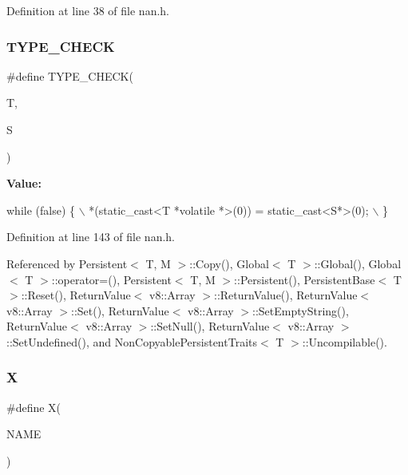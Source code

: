 Definition at line 38 of file nan.\+h.

\mbox{\label{nan_8h_af595745a6f551e1fb35ee4a70a701875}} 
\subsubsection{T\+Y\+P\+E\+\_\+\+C\+H\+E\+CK}
{\footnotesize\ttfamily \#define T\+Y\+P\+E\+\_\+\+C\+H\+E\+CK(\begin{DoxyParamCaption}\item[{}]{T,  }\item[{}]{S }\end{DoxyParamCaption})}

{\bfseries Value\+:}
\begin{DoxyCode}
\textcolor{keywordflow}{while} (\textcolor{keyword}{false}) \{                                                            \(\backslash\)
      *(\textcolor{keyword}{static\_cast<}T *\textcolor{keyword}{volatile }*\textcolor{keyword}{>}(0)) = \textcolor{keyword}{static\_cast<}S*\textcolor{keyword}{>}(0);                   \(\backslash\)
    \}
\end{DoxyCode}


Definition at line 143 of file nan.\+h.



Referenced by Persistent$<$ T, M $>$\+::\+Copy(), Global$<$ T $>$\+::\+Global(), Global$<$ T $>$\+::operator=(), Persistent$<$ T, M $>$\+::\+Persistent(), Persistent\+Base$<$ T $>$\+::\+Reset(), Return\+Value$<$ v8\+::\+Array $>$\+::\+Return\+Value(), Return\+Value$<$ v8\+::\+Array $>$\+::\+Set(), Return\+Value$<$ v8\+::\+Array $>$\+::\+Set\+Empty\+String(), Return\+Value$<$ v8\+::\+Array $>$\+::\+Set\+Null(), Return\+Value$<$ v8\+::\+Array $>$\+::\+Set\+Undefined(), and Non\+Copyable\+Persistent\+Traits$<$ T $>$\+::\+Uncompilable().

\mbox{\label{nan_8h_a999f2a70558a7cf08d2e34789a59d57a}} 
\subsubsection{X}
{\footnotesize\ttfamily \#define X(\begin{DoxyParamCaption}\item[{}]{N\+A\+ME }\end{DoxyParamCaption})}

